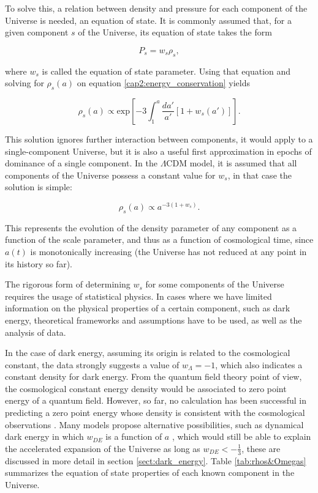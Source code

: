 \documentclass[openany,a4paper,12pt,oneside]{book}
\begin{document}
\begin{spacing}{1.5}
To solve this, a relation between density and pressure for each component of the Universe is needed, an equation of state. It is commonly assumed that, for a given component $s$ of the Universe, its equation of state takes the form

\begin{equation}\label{ch2:eq_state}
    P_s=w_s\rho_s,
\end{equation}

\noindent where $w_s$ is called the equation of state parameter. Using that equation and solving for $\rho_s(a)$ on equation \eqref{cap2:energy_conservation} yields

\begin{equation}\label{ch2:rho_s(a)_general}
    \rho_s(a)\propto \text{exp}\left[-3\int_1^a \frac{da'}{a'}[1+w_s(a')]\right].
\end{equation}

This solution ignores further interaction between components, it would apply to a single-component Universe, but it is also a useful first approximation in epochs of dominance of a single component. In the $\Lambda$CDM model, it is assumed that all components of the Universe possess a constant value for $w_s$, in that case the solution is simple:

\begin{equation}\label{ch2:rho_s_ws_const}
    \rho_s(a)\propto a^{-3(1+w_s)}.
\end{equation}

\noindent This represents the evolution of the density parameter of any component as a function of the scale parameter, and thus as a function of cosmological time, since $a(t)$ is monotonically increasing (the Universe has not reduced at any point in its history so far).

The rigorous form of determining $w_s$ for some components of the Universe requires the usage of statistical physics. In cases where we have limited information on the physical properties of a certain component, such as dark energy, theoretical frameworks and assumptions have to be used, as well as the analysis of data.

In the case of dark energy, assuming its origin is related to the cosmological constant, the data strongly suggests a value of $w_\Lambda=-1$, which also indicates a constant density for dark energy. From the quantum field theory point of view, the cosmological constant energy density would be associated to zero point energy of a quantum field. However, so far, no calculation has been successful in predicting a zero point energy whose density is consistent with the cosmological observations \cite{Weinberg_Lambda_1989}. Many models propose alternative possibilities, such as dynamical dark energy in which $w_{DE}$ is a function of $a$ \cite{DE_models}, which would still be able to explain the accelerated expansion of the Universe as long as $w_{DE}<-\frac{1}{3}$, these are discussed in more detail in section \ref{sect:dark_energy}. Table \ref{tab:rhos&Omegas} summarizes the equation of state properties of each known component in the Universe.


\end{spacing}
\end{document}
